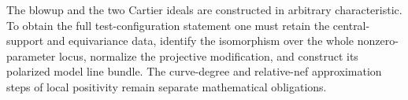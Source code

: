 \begin{remark}
\label{rmk:pl-cartier-remaining-testconfig}
The blowup and the two Cartier ideals are constructed in arbitrary
characteristic.  To obtain the full test-configuration statement one
must retain the central-support and equivariance data, identify the
isomorphism over the whole nonzero-parameter locus, normalize the
projective modification, and construct its polarized model line bundle.
The curve-degree and relative-nef approximation steps of local positivity
remain separate mathematical obligations.
\end{remark}
